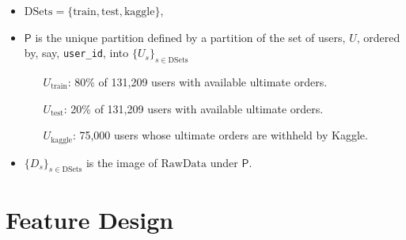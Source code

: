 \documentclass[handout]{beamer}
\begin{document}
\begin{frame}
\begin{itemize}[<+->]
\item \(\mathrm{DSets} = \{\mathrm{train, test, kaggle}\}\),
\vfill
\item \( \mathsf{P} \) is the unique partition defined by a partition of the set of users,
$U$, ordered by, say, \texttt{user\_id}, into $\{ U_s \}_{s \in \mathrm{DSets}}$%
\vfill
\begin{itemize}
\item[\(U_\text{train}\):] 80\%
of 131,209 users with available ultimate orders.
\vfill
\item[\(U_\text{test}\):] 20\% 
of 131,209 users with available ultimate orders.
\vfill
\item[\(U_\text{kaggle}\):] %
75,000 users whose ultimate orders
are withheld by Kaggle.
\vfill
\end{itemize}
\item \(\{D_s\}_{s \in \mathrm{DSets}}\) is the image of $\mathrm{RawData}$ under $\mathsf{P}$.
\vfill
\end{itemize}

\end{frame}



\section{Feature Design}\label{feature-design}
\end{document}
